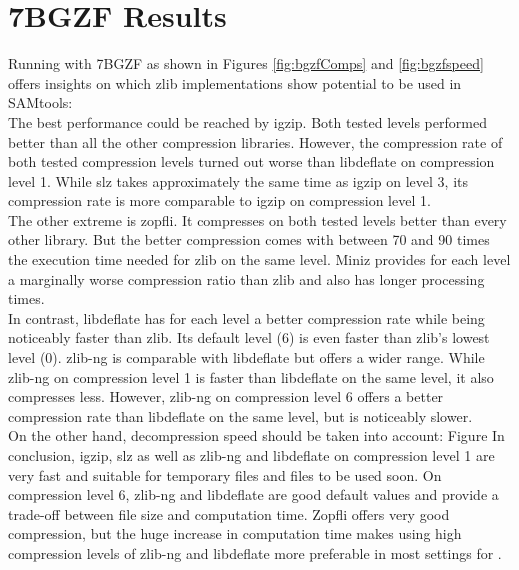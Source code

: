 \section{7BGZF Results}
Running \sort with 7BGZF as shown in Figures \ref{fig:bgzfComps} and \ref{fig:bgzfspeed} offers insights on which zlib implementations show potential to be used in SAMtools: \\
The best performance could be reached by igzip. Both tested levels performed better than all the other compression libraries. However, the compression rate of both tested compression levels turned out worse than libdeflate on compression level 1. While slz takes approximately the same time as igzip on level 3, its compression rate is more comparable to igzip on compression level 1. \\
The other extreme is zopfli. It compresses on both tested levels better than every other library. But the better compression comes with between 70 and 90 times the execution time needed for zlib on the same level.
Miniz provides for each level a marginally worse compression ratio than zlib and also has longer processing times. \\
In contrast, libdeflate has for each level a better compression rate while being noticeably faster than zlib. Its default level (6) is even faster than zlib's lowest level (0).
zlib-ng is comparable with libdeflate but offers a wider range. While zlib-ng on compression level 1 is faster than libdeflate on the same level, it also compresses less. However, zlib-ng on compression level 6 offers a better compression rate than libdeflate on the same level, but is noticeably slower. \\
On the other hand, decompression speed should be taken into account: Figure 
In conclusion, igzip, slz as well as zlib-ng and libdeflate on compression level 1 are very fast and suitable for temporary files and files to be used soon. On compression level 6, zlib-ng and libdeflate are good default values and provide a trade-off between file size and computation time. Zopfli offers very good compression, but the huge increase in computation time makes using high compression levels of zlib-ng and libdeflate more preferable in most settings for \sort.

